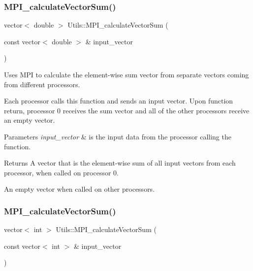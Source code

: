 \subsubsection{\texorpdfstring{M\+P\+I\+\_\+calculate\+Vector\+Sum()}{MPI\_calculateVectorSum()}\hspace{0.1cm}{\footnotesize\ttfamily [1/2]}}
{\footnotesize\ttfamily vector$<$ double $>$ Utils\+::\+M\+P\+I\+\_\+calculate\+Vector\+Sum (\begin{DoxyParamCaption}\item[{const vector$<$ double $>$ \&}]{input\+\_\+vector }\end{DoxyParamCaption})}



Uses M\+PI to calculate the element-\/wise sum vector from separate vectors coming from different processors. 

Each processor calls this function and sends an input vector. Upon function return, processor 0 receives the sum vector and all of the other processors receive an empty vector. 
\begin{DoxyParams}{Parameters}
{\em input\+\_\+vector} & is the input data from the processor calling the function. \\
\hline
\end{DoxyParams}
\begin{DoxyReturn}{Returns}
A vector that is the element-\/wise sum of all input vectors from each processor, when called on processor 0. 

An empty vector when called on other processors. 
\end{DoxyReturn}
\mbox{\label{namespace_utils_a07efe2f58beb35b78d295a0b0dc1f660}} 
\subsubsection{\texorpdfstring{M\+P\+I\+\_\+calculate\+Vector\+Sum()}{MPI\_calculateVectorSum()}\hspace{0.1cm}{\footnotesize\ttfamily [2/2]}}
{\footnotesize\ttfamily vector$<$ int $>$ Utils\+::\+M\+P\+I\+\_\+calculate\+Vector\+Sum (\begin{DoxyParamCaption}\item[{const vector$<$ int $>$ \&}]{input\+\_\+vector }\end{DoxyParamCaption})}



